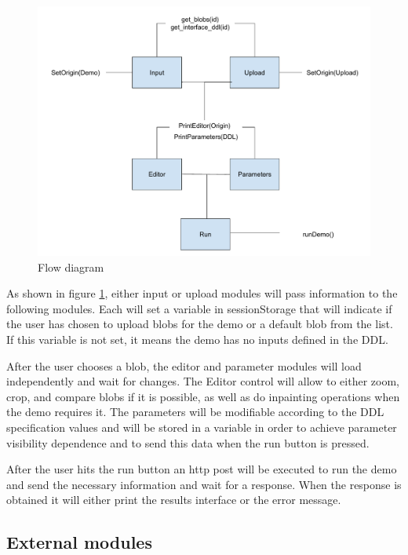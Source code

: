 \begin{figure}[h]
	\centering
	\includegraphics[width=\textwidth]{images/flow}
	\caption{Flow diagram} 
	\label{fig:flow_diagram}
\end{figure} 


As shown in figure  \ref{fig:flow_diagram}, either input or upload modules will pass 
information to the following modules. Each will set a variable in sessionStorage that will indicate if the user has chosen to 
upload blobs for the demo or a default blob from the list. If this variable is not set, it means the demo has no inputs defined 
in the DDL.

After the user chooses a blob, the editor and parameter modules will load independently and wait for changes. The Editor control 
will allow to either zoom, crop, and compare blobs if it is possible, as well as do inpainting operations when the demo requires it. 
The parameters will be modifiable according to the DDL specification values and will be stored in a variable in order to achieve 
parameter visibility dependence and to send this data when the run button is pressed.

After the user hits the run button an http post will be executed to run the demo and send the necessary information and wait for 
a response. When the response is obtained it will either print the results interface or the error message.


\subsection{External modules}

